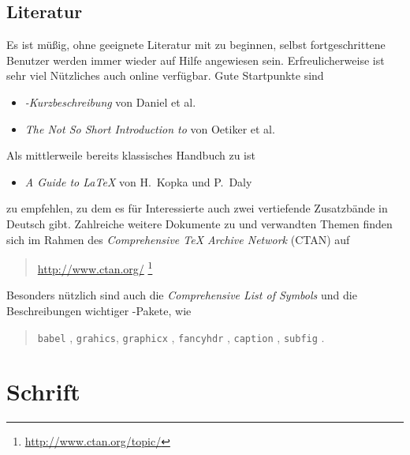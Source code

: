 \subsection{Literatur}
\label{sec:literatur}

Es ist müßig, ohne geeignete Literatur mit \latex zu beginnen, selbst
fortgeschrittene Benutzer werden immer wieder auf Hilfe angewiesen
sein. Erfreulicherweise ist sehr viel Nützliches auch online verfügbar.
Gute Startpunkte sind \zB
%
\begin{itemize}
\item \emph{{\rm\LaTeXe}-Kurzbeschreibung} von Daniel et al.\ \cite{Daniel2012}
\item \emph{The Not So Short Introduction to {\rm \LaTeXe}}
            von Oetiker et al.\ \cite{Oetiker2014}
\end{itemize}
%
\noindent
Als mittlerweile bereits klassisches Handbuch zu \latex ist
%
\begin{itemize}
  \item \emph{A Guide to {\rm\LaTeX}} von H.~Kopka und P.~Daly \cite{Kopka2003}
\end{itemize}
%
zu empfehlen, zu dem es für Interessierte auch zwei vertiefende
Zusatzbände in Deutsch gibt. Zahlreiche weitere Dokumente zu
\latex und verwandten Themen finden sich \ua im Rahmen des {\em
Comprehensive TeX Archive Network} (CTAN) auf
\begin{quote}
	\url{http://www.ctan.org/}%
	\footnote{\url{http://www.ctan.org/topic/}}
\end{quote}
%
Besonders nützlich sind auch die
\emph{Comprehensive List of {\rm \latex} Symbols} \cite{Pakin2009}
und die Beschreibungen wichtiger \latex-Pakete, wie
%
\begin{quote}
	\texttt{babel} \cite{Bezos2014},\newline
  \texttt{grahics}, \texttt{graphicx} \cite{Carlisle2014},\newline
  \texttt{fancyhdr} \cite{Oostrum2004},\newline
  \texttt{caption} \cite{Sommerfeldt2011},\newline
  \texttt{subfig} \cite{Cochran05}.
\end{quote}





\section{Schrift}

